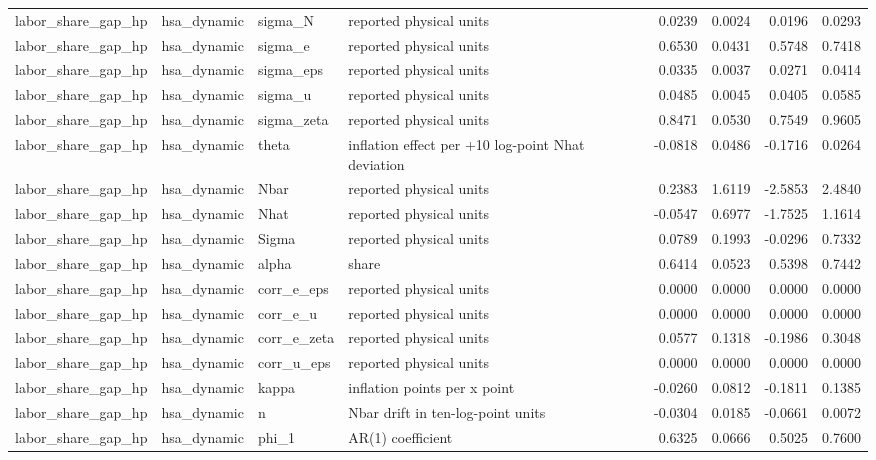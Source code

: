 \begin{tabular}{llllrrrr}
labor\_share\_gap\_hp & hsa\_dynamic & sigma\_N & reported physical units & 0.0239 & 0.0024 & 0.0196 & 0.0293 \\
labor\_share\_gap\_hp & hsa\_dynamic & sigma\_e & reported physical units & 0.6530 & 0.0431 & 0.5748 & 0.7418 \\
labor\_share\_gap\_hp & hsa\_dynamic & sigma\_eps & reported physical units & 0.0335 & 0.0037 & 0.0271 & 0.0414 \\
labor\_share\_gap\_hp & hsa\_dynamic & sigma\_u & reported physical units & 0.0485 & 0.0045 & 0.0405 & 0.0585 \\
labor\_share\_gap\_hp & hsa\_dynamic & sigma\_zeta & reported physical units & 0.8471 & 0.0530 & 0.7549 & 0.9605 \\
labor\_share\_gap\_hp & hsa\_dynamic & theta & inflation effect per +10 log-point Nhat deviation & -0.0818 & 0.0486 & -0.1716 & 0.0264 \\
labor\_share\_gap\_hp & hsa\_dynamic & Nbar & reported physical units & 0.2383 & 1.6119 & -2.5853 & 2.4840 \\
labor\_share\_gap\_hp & hsa\_dynamic & Nhat & reported physical units & -0.0547 & 0.6977 & -1.7525 & 1.1614 \\
labor\_share\_gap\_hp & hsa\_dynamic & Sigma & reported physical units & 0.0789 & 0.1993 & -0.0296 & 0.7332 \\
labor\_share\_gap\_hp & hsa\_dynamic & alpha & share & 0.6414 & 0.0523 & 0.5398 & 0.7442 \\
labor\_share\_gap\_hp & hsa\_dynamic & corr\_e\_eps & reported physical units & 0.0000 & 0.0000 & 0.0000 & 0.0000 \\
labor\_share\_gap\_hp & hsa\_dynamic & corr\_e\_u & reported physical units & 0.0000 & 0.0000 & 0.0000 & 0.0000 \\
labor\_share\_gap\_hp & hsa\_dynamic & corr\_e\_zeta & reported physical units & 0.0577 & 0.1318 & -0.1986 & 0.3048 \\
labor\_share\_gap\_hp & hsa\_dynamic & corr\_u\_eps & reported physical units & 0.0000 & 0.0000 & 0.0000 & 0.0000 \\
labor\_share\_gap\_hp & hsa\_dynamic & kappa & inflation points per x point & -0.0260 & 0.0812 & -0.1811 & 0.1385 \\
labor\_share\_gap\_hp & hsa\_dynamic & n & Nbar drift in ten-log-point units & -0.0304 & 0.0185 & -0.0661 & 0.0072 \\
labor\_share\_gap\_hp & hsa\_dynamic & phi\_1 & AR(1) coefficient & 0.6325 & 0.0666 & 0.5025 & 0.7600 \\

\end{tabular}
